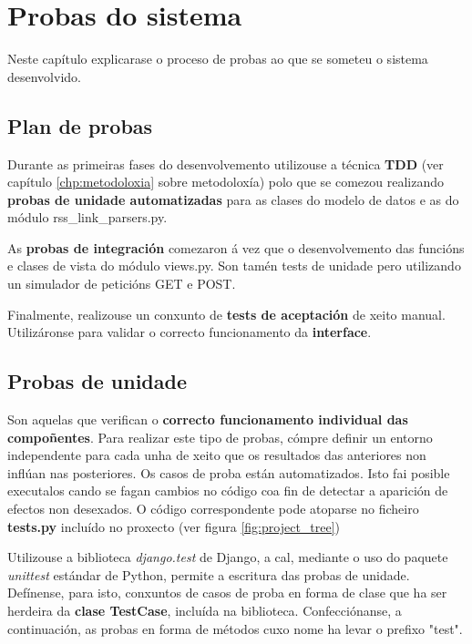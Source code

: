 \chapter[Probas do sistema]{
  \label{chp:test}
  Probas do sistema
}
\minitoc
\newpage

Neste capítulo explicarase o proceso de probas ao que se someteu o sistema desenvolvido. 

\section{Plan de probas}

Durante as primeiras fases do desenvolvemento utilizouse a técnica \textbf{TDD} (ver capítulo \ref{chp:metodoloxia} sobre metodoloxía) polo que se comezou realizando \textbf{probas de unidade automatizadas} para as clases do modelo de datos e as do módulo rss\_link\_parsers.py.

As \textbf{probas de integración} comezaron á vez que o desenvolvemento das funcións e clases de vista do módulo views.py. Son tamén tests de unidade pero utilizando un simulador de peticións GET e POST.

Finalmente, realizouse un conxunto de \textbf{tests de aceptación} de xeito manual. Utilizáronse para validar o correcto funcionamento da \textbf{interface}.


\section{Probas de unidade}

Son aquelas que verifican o \textbf{correcto funcionamento individual das compoñentes}. Para realizar este tipo de probas, cómpre definir un entorno independente para cada unha de xeito que os resultados das anteriores non inflúan nas posteriores. Os casos de proba están automatizados. Isto fai posible executalos cando se fagan cambios no código coa fin de detectar a aparición de efectos non desexados. O código correspondente pode atoparse no ficheiro \textbf{tests.py} incluído no proxecto (ver figura \ref{fig:project_tree})

Utilizouse a biblioteca \textit{django.test} de Django, a cal, mediante o uso do paquete \textit{unittest} estándar de Python, permite a escritura das probas de unidade. Defínense, para isto, conxuntos de casos de proba en forma de clase que ha ser herdeira da \textbf{clase TestCase}, incluída na biblioteca. Confecciónanse, a continuación, as probas en forma de métodos cuxo nome ha levar o prefixo "test".

